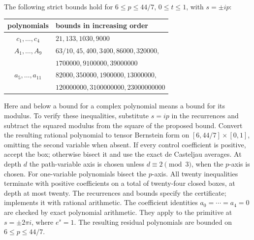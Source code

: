 The following strict bounds hold for
$6\le p\le44/7$, $0\le t\le1$, with $s=\pm ip$:
\begin{center}\small
\begin{tabular}{cl}
\toprule
polynomials & bounds in increasing order\\\midrule
$c_1,\ldots,c_4$ & $21,133,1030,9000$\\
$A_1,\ldots,A_9$ & $63/10,45,400,3400,86000,320000,$\\
 & $1700000,9100000,39000000$\\
$a_5,\ldots,a_{11}$ & $82000,350000,1900000,13000000,$\\
 & $120000000,3100000000,23000000000$\\\bottomrule
\end{tabular}
\end{center}
Here and below a bound for a complex polynomial means a bound for its
modulus. To verify these inequalities, substitute $s=ip$ in the
recurrences and subtract
the squared modulus from the square of the proposed bound. Convert
the resulting rational polynomial to tensor Bernstein form on
$[6,44/7]\times[0,1]$, omitting the second variable when absent.
If every control coefficient is positive, accept the box; otherwise
bisect it and use the exact de Casteljau averages. At depth $d$ the
path-variable axis is chosen unless $d\equiv2\pmod3$, when the
$p$-axis is chosen. For one-variable polynomials bisect the $p$-axis.
All twenty inequalities terminate with positive coefficients on a total
of twenty-four closed boxes, at depth at most twenty. The recurrences
and bounds specify the certificate;
 implements it with rational arithmetic.
The coefficient identities $a_0=\cdots=a_4=0$ are checked by exact
polynomial arithmetic. They apply to the primitive at $s=\pm2\pi i$,
where $e^s=1$. The resulting residual polynomials are bounded on
$6\le p\le44/7$.

